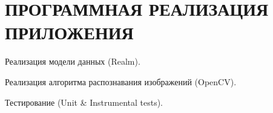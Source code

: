 \section[Программная реализация приложения]{%
  ПРОГРАММНАЯ РЕАЛИЗАЦИЯ ПРИЛОЖЕНИЯ
}

\label{sec:implementation}

Реализация  модели данных (Realm).

Реализация алгоритма распознавания изображений (OpenCV).

Тестирование (Unit \& Instrumental tests).